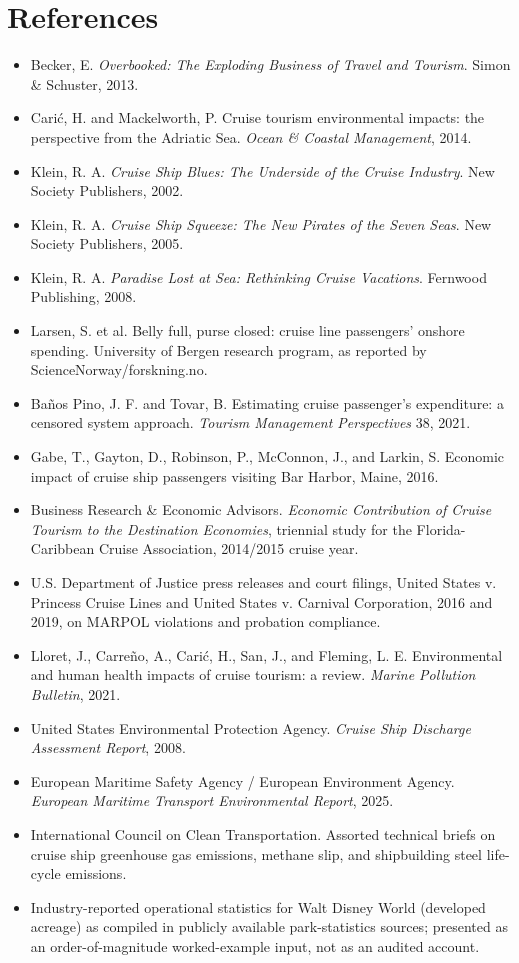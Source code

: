 \documentclass[11pt]{article}
\begin{document}
\section*{References}
\begin{itemize}[nosep]
\item Becker, E. \emph{Overbooked: The Exploding Business of Travel and Tourism}. Simon \& Schuster, 2013.
\item Cari\'c, H. and Mackelworth, P. Cruise tourism environmental impacts: the perspective from the Adriatic Sea. \emph{Ocean \& Coastal Management}, 2014.
\item Klein, R. A. \emph{Cruise Ship Blues: The Underside of the Cruise Industry}. New Society Publishers, 2002.
\item Klein, R. A. \emph{Cruise Ship Squeeze: The New Pirates of the Seven Seas}. New Society Publishers, 2005.
\item Klein, R. A. \emph{Paradise Lost at Sea: Rethinking Cruise Vacations}. Fernwood Publishing, 2008.
\item Larsen, S. et al. Belly full, purse closed: cruise line passengers' onshore spending. University of Bergen research program, as reported by ScienceNorway/forskning.no.
\item Ba\~nos Pino, J. F. and Tovar, B. Estimating cruise passenger's expenditure: a censored system approach. \emph{Tourism Management Perspectives} 38, 2021.
\item Gabe, T., Gayton, D., Robinson, P., McConnon, J., and Larkin, S. Economic impact of cruise ship passengers visiting Bar Harbor, Maine, 2016.
\item Business Research \& Economic Advisors. \emph{Economic Contribution of Cruise Tourism to the Destination Economies}, triennial study for the Florida-Caribbean Cruise Association, 2014/2015 cruise year.
\item U.S. Department of Justice press releases and court filings, United States v. Princess Cruise Lines and United States v. Carnival Corporation, 2016 and 2019, on MARPOL violations and probation compliance.
\item Lloret, J., Carre\~no, A., Cari\'c, H., San, J., and Fleming, L. E. Environmental and human health impacts of cruise tourism: a review. \emph{Marine Pollution Bulletin}, 2021.
\item United States Environmental Protection Agency. \emph{Cruise Ship Discharge Assessment Report}, 2008.
\item European Maritime Safety Agency / European Environment Agency. \emph{European Maritime Transport Environmental Report}, 2025.
\item International Council on Clean Transportation. Assorted technical briefs on cruise ship greenhouse gas emissions, methane slip, and shipbuilding steel life-cycle emissions.
\item Industry-reported operational statistics for Walt Disney World (developed acreage) as compiled in publicly available park-statistics sources; presented as an order-of-magnitude worked-example input, not as an audited account.
\end{itemize}
\end{document}
